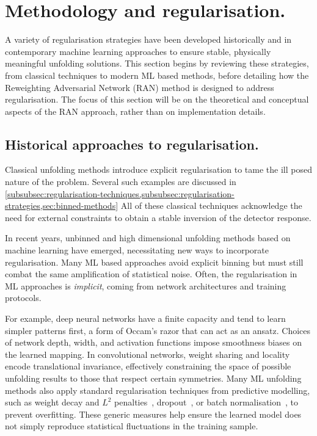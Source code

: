 {{\section{Methodology and regularisation.}
\label{sec:ran-methodology-and-regularisation}
\sectionminitoc
    A variety of regularisation strategies have been developed historically and in contemporary machine learning approaches to ensure stable, physically meaningful unfolding solutions.
    This section begins by reviewing these strategies, from classical techniques to modern ML based methods, before detailing how the Reweighting Adversarial Network (RAN) method is designed to address regularisation.
    The focus of this section will be on the theoretical and conceptual aspects of the RAN approach, rather than on implementation details.

    \subsection{Historical approaches to regularisation.}
        Classical unfolding methods introduce explicit regularisation to tame the ill posed nature of the problem.
        Several such examples are discussed in \cref{subsubsec:regularisation-techniques,subsubsec:regularisation-strategies,sec:binned-methods}
        All of these classical techniques acknowledge the need for external constraints to obtain a stable inversion of the detector response.

        In recent years, unbinned and high dimensional unfolding methods based on machine learning have emerged, necessitating new ways to incorporate regularisation.
        Many ML based approaches avoid explicit binning but must still combat the same amplification of statistical noise.
        Often, the regularisation in ML approaches is \emph{implicit}, coming from network architectures and training protocols.
        
        For example, deep neural networks have a finite capacity and tend to learn simpler patterns first, a form of Occam’s razor that can act as an ansatz.
        Choices of network depth, width, and activation functions impose smoothness biases on the learned mapping.
        In convolutional networks, weight sharing and locality encode translational invariance, effectively constraining the space of possible unfolding results to those that respect certain symmetries.
        Many ML unfolding methods also apply standard regularisation techniques from predictive modelling, such as weight decay and $L^2$ penalties~\cite{dangelo_why_2024}, dropout~\cite{srivastava_dropout_2014}, or batch normalisation~\cite{Ioffe2015BatchShift}, to prevent overfitting.
        These generic measures help ensure the learned model does not simply reproduce statistical fluctuations in the training sample.

}}
